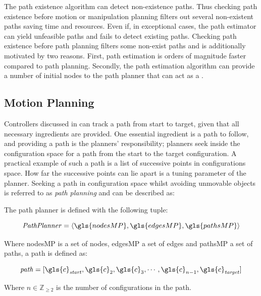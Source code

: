 The path existence algorithm can detect non-existence paths. Thus checking path existence before motion or manipulation planning filters out several non-existent paths saving time and resources. Even if, in exceptional cases, the path estimator can yield unfeasible paths and fails to detect existing paths. Checking path existence before path planning filters some non-exist paths and is additionally motivated by two reasons. First, path estimation is orders of magnitude faster compared to path planning. Secondly, the path estimation algorithm can provide a number of initial nodes to the path planner that can act as a .


\subsection{Motion Planning}%
\label{subsec:motion_planning}
Controllers discussed in  can track a path from start to target, given that all necessary ingredients are provided. One essential ingredient is a path to follow, and providing a path is the planners' responsibility; planners seek inside the configuration space for a path from the start to the target configuration. A practical example of such a path is a list of successive points in configurations space. How far the successive points can lie apart is a tuning parameter of the planner. Seeking a path in configuration space whilst avoiding unmovable objects is referred to as \textit{path planning} and can be described as:\bs

\textit{}\bs

The path planner is defined with the following tuple:

\[\mathit{Path Planner} = \left\langle \gls{nodesMP}, \gls{edgesMP}, \gls{pathsMP}\right\rangle\]

Where \gls{nodesMP} is a set of nodes, \gls{edgesMP} a set of edges and \gls{pathsMP} a set of paths, a path is defined as:

\[\mathit{path} = [\gls{c}_\mathit{start}, \gls{c}_2, \gls{c}_3, \cdots, \gls{c}_{n-1}, \gls{c}_\mathit{target}]\]

Where $n \in \mathbb{Z}_{\geq 2}$ is the number of configurations in the path.\bs

